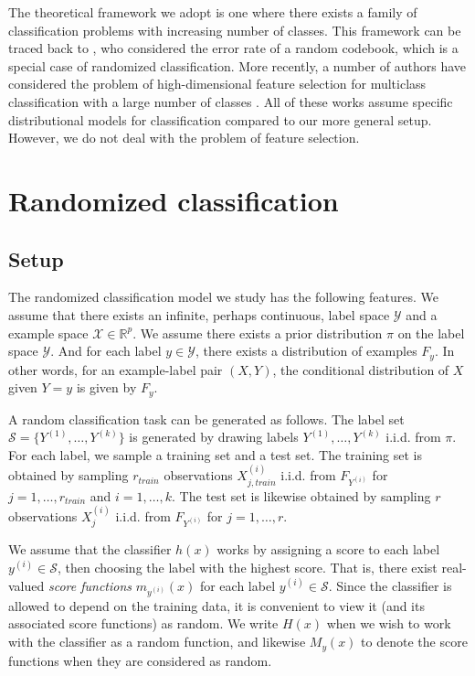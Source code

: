 \documentclass[twoside,11pt]{article}
\begin{document}
The theoretical framework we adopt is one where there exists a family
of classification problems with increasing number of classes. This
framework can be traced back to \cite{Shannon1948}, who considered the
error rate of a random codebook, which is a special case of randomized
classification. More recently, a number of authors have considered the
problem of high-dimensional feature selection for multiclass
classification with a large number of classes \citep{pan2016ultrahigh,
  abramovich2015feature, davis2011bayesian}.  All of these works
assume specific distributional models for classification compared to
our more general setup. However, we do not deal with the problem of
feature selection.

\section{Randomized classification}\label{sec:rc_motivation}


\subsection{Setup}

The randomized classification model we study has the following
features.  We assume that there exists an infinite, perhaps
continuous, label space $\mathcal{Y}$ and a example space $\mathcal{X}
\in \mathbb{R}^p$.  We assume there exists a prior distribution $\pi$
on the label space $\mathcal{Y}$.  And for each label $y \in
\mathcal{Y}$, there exists a distribution of examples $F_y$. In other
words, for an example-label pair $(X, Y)$, the conditional
distribution of $X$ given $Y = y$ is given by $F_y$.

A random classification task can be generated as follows.  The label
set $\mathcal{S} = \{Y^{(1)},\hdots, Y^{(k)}\}$ is generated by
drawing labels $Y^{(1)},\hdots, Y^{(k)}$ i.i.d. from $\pi$.  For each
label, we sample a training set and a test set.  The training set is
obtained by sampling $r_{train}$ observations $X_{j, train}^{(i)}$
i.i.d. from $F_{Y^{(i)}}$ for $j = 1,\hdots, r_{train}$ and $i =
1,\hdots, k$.  The test set is likewise obtained by sampling $r$
observations $X_j^{(i)}$ i.i.d. from $F_{Y^{(i)}}$ for $j = 1,\hdots,
r$.

We assume that the classifier $h(x)$ works by assigning a score to
each label $y^{(i)} \in \mathcal{S}$, then choosing the label with the
highest score.  That is, there exist real-valued \emph{score
  functions} $m_{y^{(i)}}(x)$ for each label $y^{(i)} \in
\mathcal{S}$.  Since the classifier is allowed to depend on the
training data, it is convenient to view it (and its associated score
functions) as random.  We write $H(x)$ when we wish to work with the
classifier as a random function, and likewise $M_y(x)$ to denote the
score functions when they are considered as random.
\end{document}
